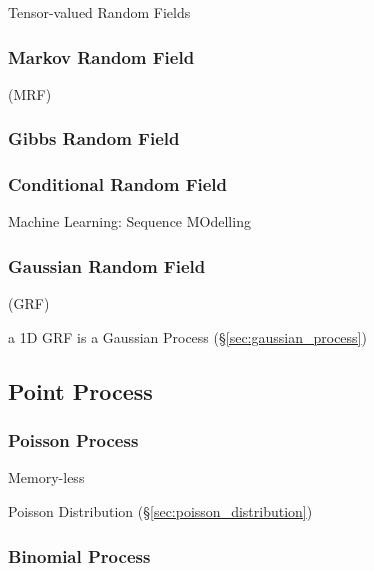 Tensor-valued Random Fields



\subsubsection{Markov Random Field}\label{sec:markov_random_field}

(MRF)



\subsubsection{Gibbs Random Field}\label{sec:gibbs_random_field}

\subsubsection{Conditional Random Field}\label{sec:conditional_random_field}

Machine Learning: Sequence MOdelling



\subsubsection{Gaussian Random Field}\label{sec:gaussian_random_field}

(GRF)

a 1D GRF is a Gaussian Process (\S\ref{sec:gaussian_process})



\subsection{Point Process}\label{sec:point_process}

\subsubsection{Poisson Process}\label{sec:poisson_process}

Memory-less

Poisson Distribution (\S\ref{sec:poisson_distribution})



\subsubsection{Binomial Process}\label{sec:binomial_process}

